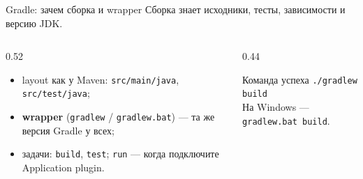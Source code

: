 \begin{frame}{Gradle: зачем сборка и wrapper}
  Сборка знает исходники, тесты, зависимости и версию JDK.

  \medskip
  \begin{columns}[T]
    \begin{column}{0.52\textwidth}
      \begin{itemize}\setlength\itemsep{0.35em}
        \item layout как у Maven: \texttt{src/main/java}, \texttt{src/test/java};
        \item \textbf{wrapper} (\texttt{gradlew} / \texttt{gradlew.bat}) ---
              та же версия Gradle у всех;
        \item задачи: \texttt{build}, \texttt{test};
          \texttt{run} --- когда подключите Application plugin.
      \end{itemize}
    \end{column}
    \begin{column}{0.44\textwidth}
      \begin{block}{Команда успеха}
        \texttt{./gradlew build}\\[0.4em]
        {\footnotesize На Windows --- \texttt{gradlew.bat build}.}
      \end{block}
    \end{column}
  \end{columns}
\end{frame}

